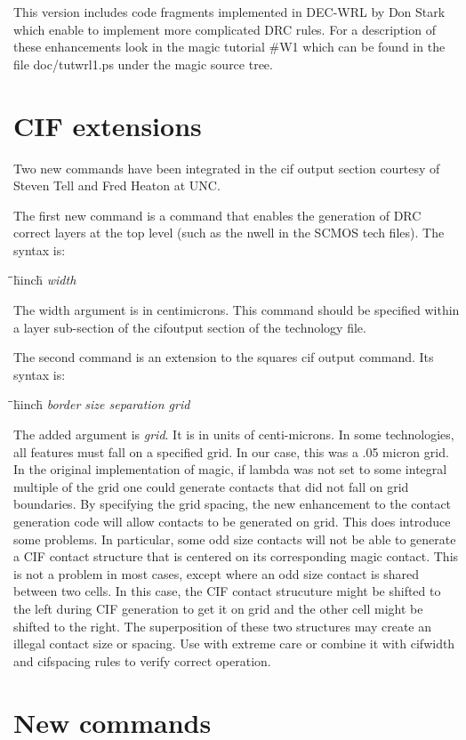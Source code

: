 \documentclass[letterpaper,twoside,12pt]{article}
\def\hinch{\hspace*{0.5in}}
\def\starti{\begin{center}\begin{tabbing}\hinch\=\hinch\=\hinch\=hinch\hinch\=\kill}
\def\endi{\end{tabbing}\end{center}}
\def\ii{\>\>\>}
\begin{document}
This version includes code fragments implemented in DEC-WRL by Don Stark
which enable to implement more complicated DRC rules. For a description
of these enhancements look in the magic tutorial \#W1 which can be
found in the file doc/tutwrl1.ps under the magic source tree.

\section{CIF extensions}

Two new commands have been integrated in the cif output section courtesy
of Steven Tell and Fred Heaton at UNC. 

The first new command is a command that
enables the generation of DRC correct layers at the top level (such as
the nwell in the SCMOS tech files). The syntax is:

\starti
   \ii {\bfseries  min-width} {\itshape width }
\endi

The width argument is in centimicrons. This command should be specified
within a layer sub-section of the cifoutput section of the technology
file.

The second command is an extension to the squares cif output command.
Its syntax is:

\starti
   \ii {\bfseries  squares-grid} {\itshape border size separation grid}
\endi

The added argument is {\itshape grid}.  It is
in units of centi-microns.  In some technologies, all features
must fall on a specified grid.  In our case, this was a .05
micron grid.  In the original implementation of magic, if lambda
was not set to some integral multiple of the grid one could
generate contacts that did not fall on grid boundaries.  By
specifying the grid spacing, the new enhancement to the contact
generation code will allow contacts to be generated on grid.
This does introduce some problems.  In particular, some odd
size contacts will not be able to generate a CIF contact structure
that is centered on its corresponding magic contact.  This is
not a problem in most cases, except where an odd size contact
is shared between two cells.  In this case, the CIF contact
strucuture might be shifted to the left during CIF generation
to get it on grid and the other cell might be shifted to the
right.  The superposition of these two structures may create
an illegal contact size or spacing. Use with extreme care or combine
it with cifwidth and cifspacing rules to verify correct operation.

\section{New commands}
\end{document}
